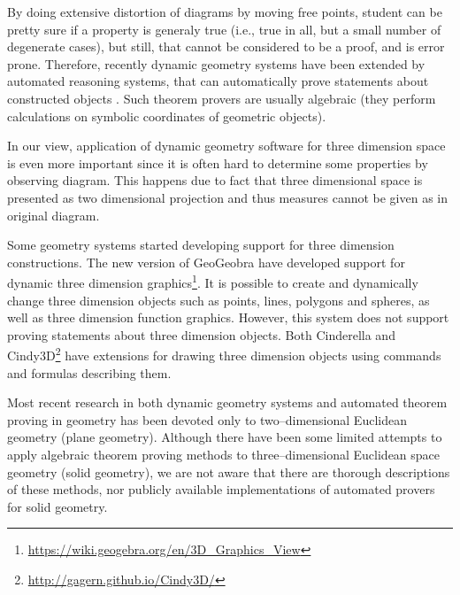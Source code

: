 \documentclass[final,1p,times,authoryear]{elsarticle}
\begin{document}
By doing extensive distortion of diagrams by moving free points,
student can be pretty sure if a property is generaly true (i.e., true
in all, but a small number of degenerate cases), but still, that
cannot be considered to be a proof, and is error prone. Therefore,
recently dynamic geometry systems have been extended by automated
reasoning systems, that can automatically prove statements about
constructed objects \cite{geogebra-provers}. Such theorem provers are
usually algebraic (they perform calculations on symbolic coordinates
of geometric objects).

In our view, application of dynamic geometry software for three
dimension space is even more important since it is often hard to
determine some properties by observing diagram. This happens due to
fact that three dimensional space is presented as two dimensional
projection and thus measures cannot be given as in original diagram.

Some geometry systems started developing support for three dimension
constructions. The new version of GeoGeobra have developed support for
dynamic three dimension
graphics\footnote{\url{https://wiki.geogebra.org/en/3D_Graphics_View}}. It
is possible to create and dynamically change three dimension objects
such as points, lines, polygons and spheres, as well as three
dimension function graphics. However, this system does not support
proving statements about three dimension objects. Both Cinderella and
Cindy3D\footnote{\url{http://gagern.github.io/Cindy3D/}} have
extensions for drawing three dimension objects using commands and
formulas describing them.

Most recent research in both dynamic geometry systems and automated
theorem proving in geometry has been devoted only to two--dimensional
Euclidean geometry (plane geometry). Although there have been some
limited attempts to apply algebraic theorem proving methods to
three--dimensional Euclidean space geometry (solid geometry), we are
not aware that there are thorough descriptions of these methods, nor
publicly available implementations of automated provers for solid
geometry. 
\end{document}
